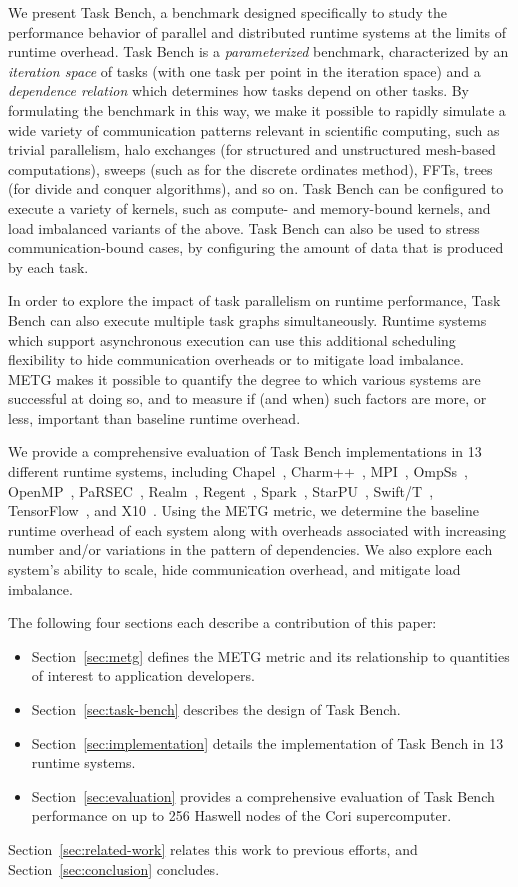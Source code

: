 We present Task Bench, a benchmark designed specifically to study the
performance behavior of parallel and distributed runtime systems at
the limits of runtime overhead. Task Bench is a \emph{parameterized}
benchmark, characterized by an \emph{iteration space} of tasks (with
one task per point in the iteration space) and a \emph{dependence
  relation} which determines how tasks depend on other tasks. By
formulating the benchmark in this way, we make it possible to rapidly
simulate a wide variety of communication patterns relevant in
scientific computing, such as trivial parallelism, halo exchanges (for
structured and unstructured mesh-based computations), sweeps (such as
for the discrete ordinates method), FFTs, trees (for divide and
conquer algorithms), and so on. Task Bench can be configured to
execute a variety of kernels, such as compute- and memory-bound
kernels, and load imbalanced variants of the above. Task Bench can
also be used to stress communication-bound cases, by configuring the
amount of data that is produced by each task.

In order to explore the impact of task parallelism on runtime
performance, Task Bench can also execute multiple task graphs
simultaneously. Runtime systems which support asynchronous execution
can use this additional scheduling flexibility to hide communication
overheads or to mitigate load imbalance. METG makes it possible to
quantify the degree to which various systems are successful at doing
so, and to measure if (and when) such factors are more, or less,
important than baseline runtime overhead.

We provide a comprehensive evaluation of Task Bench implementations in
13 different runtime systems, including Chapel~\cite{Chapel07},
Charm++~\cite{Charmpp93}, MPI~\cite{MPI}, OmpSs~\cite{OmpSs11},
OpenMP~\cite{OpenMPSpec40}, PaRSEC~\cite{PARSEC13},
Realm~\cite{Realm14}, Regent~\cite{Regent15}, Spark~\cite{Spark10},
StarPU~\cite{StarPU11}, Swift/T~\cite{Wozniak13},
TensorFlow~\cite{TensorFlow15}, and X10~\cite{X1005}. Using the METG
metric, we determine the baseline runtime overhead of each system
along with overheads associated with increasing number and/or
variations in the pattern of dependencies. We also explore each
system's ability to scale, hide communication overhead, and mitigate
load imbalance.

The following four sections each describe a contribution of this
paper:

\begin{itemize}
\item Section~\ref{sec:metg} defines the METG metric and its
  relationship to quantities of interest to application developers.
\item Section~\ref{sec:task-bench} describes the design of Task Bench.
\item Section~\ref{sec:implementation} details the implementation of
  Task Bench in 13 runtime systems.
\item Section~\ref{sec:evaluation} provides a comprehensive evaluation
  of Task Bench performance on up to 256 Haswell nodes of the Cori
  supercomputer.
\end{itemize}

Section~\ref{sec:related-work} relates this work to previous efforts,
and Section~\ref{sec:conclusion} concludes.
